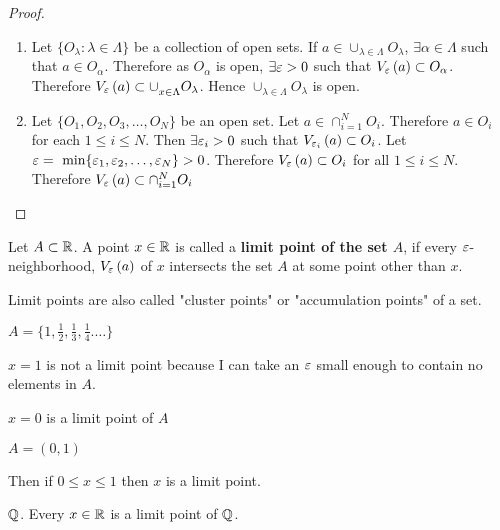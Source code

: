 \begin{proof}
	\begin{enumerate}
		\item Let $\{O_{\lambda} : \lambda \in \Lambda\} $ be a collection of open sets. If $a \in \cup_{\lambda \in  \Lambda}^{} {} O_\lambda$, $\exists \alpha \in \Lambda$ such that $a \in O_{\alpha}$. Therefore as  $O_{\alpha}$ is open, $\exists  \e > 0$ such that $V_{\e}\left( a \right) \subset O_{\alpha}$. Therefore $V_{\e}\left( a \right) \subset \cup_{x \in \Lambda}^{}O_{\lambda}$. Hence $\cup_{\lambda \in  \Lambda}^{} O_{\lambda}$ is open.
		\item Let $\{O_1, O_2, O_3, \ldots, O_N\} $ be an open set. Let $a \in \cap_{i=1}^{N} O_i$. Therefore $a \in O_i$ for each $1 \le  i \le  N$. Then $\exists  \e_{i} > 0$ such that $V_{\e_{i}}\left( a \right) \subset O_i$. Let $\e = \text{ min}\{\e_{1}, \e_{2}, \ldots, \e_{N}\} > 0$. Therefore $V_{\e}\left( a \right) \subset O_i$ for all $1 \le i\le N$. Therefore $V_{\e}\left( a \right) \subset \cap_{i=1}^{N} O_i$

	\end{enumerate}	
\end{proof}



\begin{definition}
	Let $A \subset \mathbb{R}$. A point $x \in \mathbb{R}$ is called a \textbf{limit point of the set $A$}, if every $\e$-neighborhood, $V_{\e}\left( a \right) $ of $x$ intersects the set $A$ at some point other than $x$.
\end{definition}

\begin{note}
	Limit points are also called "cluster points" or "accumulation points" of a set.
\end{note}

\begin{eg}
	$A = \{1, \frac{1}{2}, \frac{1}{3}, \frac{1}{4}. \ldots\} $

	$x= 1$ is not a limit point because I can take an $\e$ small enough to contain no elements in $A$.

	$x= 0$ is a limit point of $A$


	$A = \left( 0, 1 \right) $ 

	Then if $0 \le x \le 1$ then $x$ is a limit point.
\end{eg}

\begin{eg}
	$\mathbb{Q}$. Every $x \in \mathbb{R}$ is a limit point of $\mathbb{Q}$.
\end{eg}

